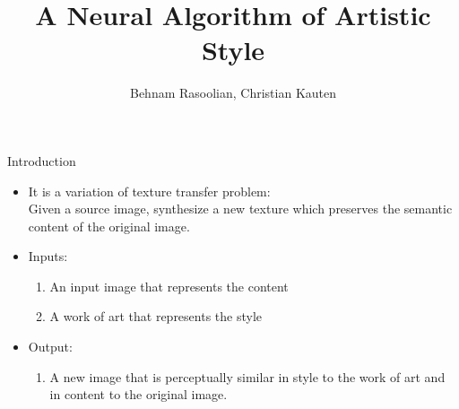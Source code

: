 \documentclass{beamer}
\title{A Neural Algorithm of Artistic Style \\ { \tiny \citeA{gatys2016image}}}
\author{Behnam Rasoolian, Christian Kauten}
\institute{Auburn University}
\date{}
\begin{document}

\frame{\titlepage}
\begin{frame}{Introduction}
    \begin{itemize}
    \item[] It is a variation of texture transfer problem:\\
    Given a source image, synthesize a new texture which preserves the
    semantic content of the original image.
    \item[] Inputs:
        \begin{enumerate}
            \item An input image that represents the content
            \item A work of art that represents the style
        \end{enumerate}
    \item[] Output:
        \begin{enumerate}
            \item A new image that is perceptually similar in style to
            the work of art and in content to the original image.
        \end{enumerate}
    \end{itemize}
\end{frame}
\end{document}
